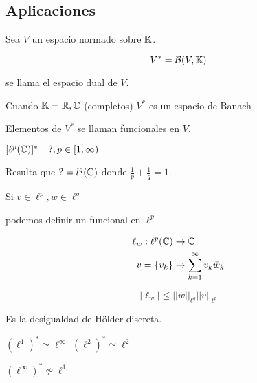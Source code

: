     \subsection{Aplicaciones}

    \begin{fdefinition}
        Sea $V$ un espacio normado sobre $\mathbb{K}$.

        \[V^*=\mathcal{B}(V,\mathbb{K})\]

        se llama el espacio \color{red} dual \color{black} de $V$.
    \end{fdefinition}

    \begin{ftheorem}
        Cuando $\mathbb{K}=\mathbb{R},\mathbb{C}$ (completos) $V^*$ es un espacio de Banach
    \end{ftheorem}

    Elementos de $V^*$ se llaman \color{red} funcionales \color{black} en $V$.


    \begin{fexample}
        $[\ell^p(\mathbb{C})]^* =?,p\in[1,\infty)$

        Resulta que $?=l^q(\mathbb{C})$ donde $\frac{1}{p}+\frac{1}{q}=1$.

        Si $v\in \ell^p,w\in\ell^q$

        podemos definir un funcional en $\ell^p$

        \begin{align*}\ell_w:\ell^p(\mathbb{C})&\to\mathbb{C}\\
        v=\{v_k\}&\to \sum_{k=1}^\infty v_k\bar w_k\end{align*}

        \[|\ell_w|\leq ||w||_{\ell^q}||v||_{\ell^p}\]

        Es la desigualdad de Hölder discreta.
    \end{fexample}

    $(\ell^1)^*\simeq \ell^\infty$
    $(\ell^2)^*\simeq \ell^2$

    \begin{fnote}
        $(\ell^\infty)^*\not\simeq \ell^1$
    \end{fnote}
